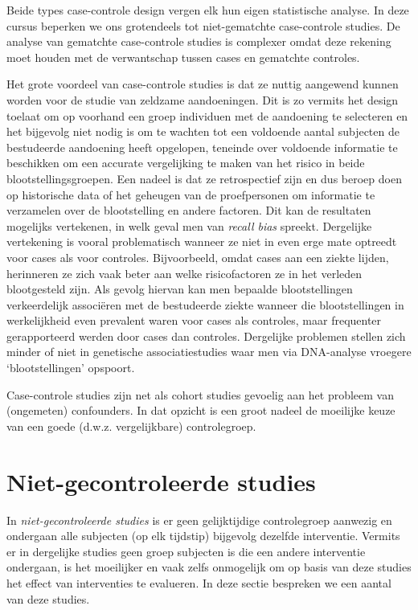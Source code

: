 \documentclass[
  dutch,
  letterpaper,
  12pt]{book}
\theoremstyle{definition}
\theoremstyle{definition}
\theoremstyle{definition}
\theoremstyle{remark}
\begin{document}
Beide types case-controle design vergen elk hun eigen statistische
analyse. In deze cursus beperken we ons grotendeels tot niet-gematchte
case-controle studies. De analyse van gematchte case-controle studies is
complexer omdat deze rekening moet houden met de verwantschap tussen
cases en gematchte controles.

Het grote voordeel van case-controle studies is dat ze nuttig aangewend
kunnen worden voor de studie van zeldzame aandoeningen. Dit is zo
vermits het design toelaat om op voorhand een groep individuen met de
aandoening te selecteren en het bijgevolg niet nodig is om te wachten
tot een voldoende aantal subjecten de bestudeerde aandoening heeft
opgelopen, teneinde over voldoende informatie te beschikken om een
accurate vergelijking te maken van het risico in beide
blootstellingsgroepen. Een nadeel is dat ze retrospectief zijn en dus
beroep doen op historische data of het geheugen van de proefpersonen om
informatie te verzamelen over de blootstelling en andere factoren. Dit
kan de resultaten mogelijks vertekenen, in welk geval men van
\emph{recall bias} spreekt. Dergelijke vertekening is vooral
problematisch wanneer ze niet in even erge mate optreedt voor cases als
voor controles. Bijvoorbeeld, omdat cases aan een ziekte lijden,
herinneren ze zich vaak beter aan welke risicofactoren ze in het
verleden blootgesteld zijn. Als gevolg hiervan kan men bepaalde
blootstellingen verkeerdelijk associëren met de bestudeerde ziekte
wanneer die blootstellingen in werkelijkheid even prevalent waren voor
cases als controles, maar frequenter gerapporteerd werden door cases dan
controles. Dergelijke problemen stellen zich minder of niet in
genetische associatiestudies waar men via DNA-analyse vroegere
`blootstellingen' opspoort.

Case-controle studies zijn net als cohort studies gevoelig aan het
probleem van (ongemeten) confounders. In dat opzicht is een groot nadeel
de moeilijke keuze van een goede (d.w.z. vergelijkbare) controlegroep.

\section{Niet-gecontroleerde studies}\label{niet-gecontroleerde-studies}

In \emph{niet-gecontroleerde studies} is er geen gelijktijdige
controlegroep aanwezig en ondergaan alle subjecten (op elk tijdstip)
bijgevolg dezelfde interventie. Vermits er in dergelijke studies geen
groep subjecten is die een andere interventie ondergaan, is het
moeilijker en vaak zelfs onmogelijk om op basis van deze studies het
effect van interventies te evalueren. In deze sectie bespreken we een
aantal van deze studies.
\end{document}
